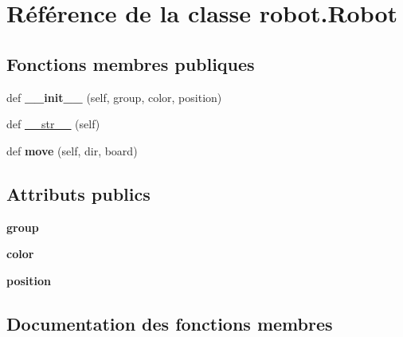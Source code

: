 \hypertarget{classrobot_1_1Robot}{}\section{Référence de la classe robot.\+Robot}
\label{classrobot_1_1Robot}
\subsection*{Fonctions membres publiques}
\begin{DoxyCompactItemize}
\item 
\mbox{\label{classrobot_1_1Robot_a79a4241cf6242acb65cd51b1c67dd263}} 
def {\bfseries \+\_\+\+\_\+init\+\_\+\+\_\+} (self, group, color, position)
\item 
def \hyperlink{classrobot_1_1Robot_a10d00e1924a0fce095fe0bdf888f1415}{\+\_\+\+\_\+str\+\_\+\+\_\+} (self)
\item 
\mbox{\label{classrobot_1_1Robot_a0227c4a66b9a23adb02a9ddf441be825}} 
def {\bfseries move} (self, dir, board)
\end{DoxyCompactItemize}
\subsection*{Attributs publics}
\begin{DoxyCompactItemize}
\item 
\mbox{\label{classrobot_1_1Robot_a3ad797bc28203e41705888907ccf1958}} 
{\bfseries group}
\item 
\mbox{\label{classrobot_1_1Robot_ac6f9cffab22675391c0726d78efa6e70}} 
{\bfseries color}
\item 
\mbox{\label{classrobot_1_1Robot_ac276dce901ab21472c05818cf7b44383}} 
{\bfseries position}
\end{DoxyCompactItemize}


\subsection{Documentation des fonctions membres}
\mbox{\label{classrobot_1_1Robot_a10d00e1924a0fce095fe0bdf888f1415}} 
